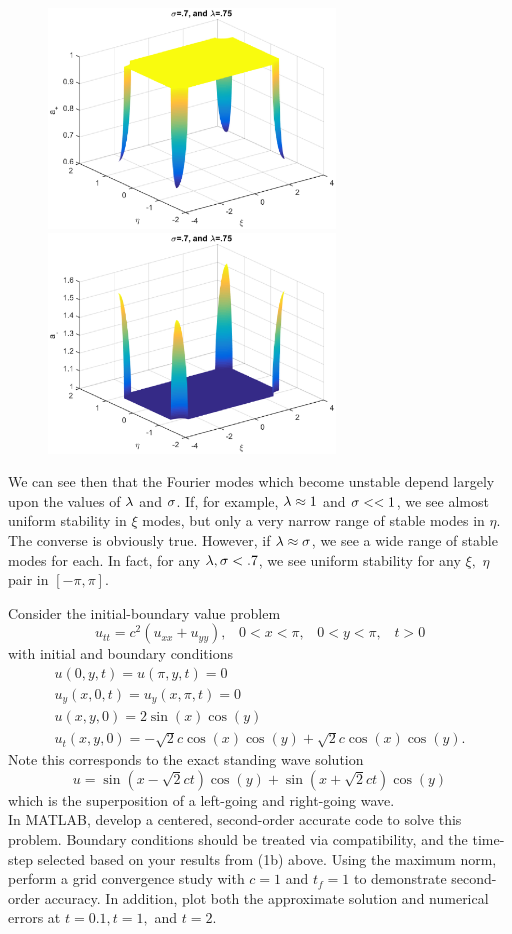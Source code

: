 \begin{figure}
			\includegraphics[width=3in]{symvwav3p}
			\includegraphics[width=3in]{symvwav3m}
			\end{figure}
			
			We can see then that the Fourier modes which become unstable depend largely upon the values of $\lambda$ and $\sigma$. If, for example, $\lambda\approx 1$ and $\sigma<<1$, we see almost uniform stability in $\xi$ modes, but only a very narrow range of stable modes in $\eta.$ The converse is obviously true. However, if $\lambda\approx\sigma$, we see a wide range of stable modes for each. In fact, for any $\lambda,\sigma<.7$, we see uniform stability for any $\xi,$ $\eta$ pair in $[-\pi,\pi]$. 
			\eenum
			\pagebreak
		\item Consider the initial-boundary value problem
		$$u_{tt}=c^2(u_{xx}+u_{yy}),\;\;\; 0<x<\pi,\;\;\;0<y<\pi,\;\;\;t>0$$
		with initial and boundary conditions
		\begin{align*}
		u(0,y,t)=u(\pi,y,t)=0\\
		u_y(x,0,t)=u_y(x,\pi,t)=0\\
		u(x,y,0)=2\sin(x)\cos(y)\\
		u_t(x,y,0)=-\sqrt{2}c\cos(x)\cos(y)+\sqrt{2}c\cos(x)\cos(y).
		\end{align*}
		Note this corresponds to the exact standing wave solution
		$$u=\sin(x-\sqrt{2}ct)\cos(y)+\sin(x+\sqrt{2}ct)\cos(y)$$
		which is the superposition of a left-going and right-going wave.\\
		In MATLAB, develop a centered, second-order accurate code to solve this problem. Boundary conditions should be treated via compatibility, and the time-step selected based on your results from (1b) above. Using the maximum norm, perform a grid convergence study with $c=1$ and $t_f=1$ to demonstrate second-order accuracy. In addition, plot both the approximate solution and numerical errors at $t=0.1,t=1, $ and $t=2.$\\
		
